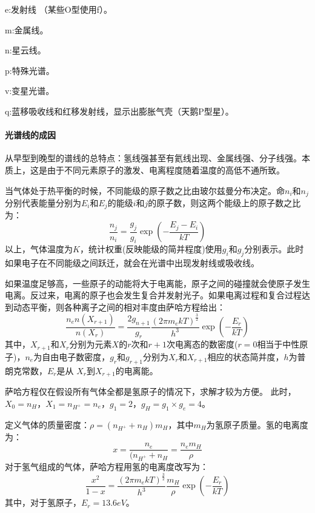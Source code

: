 e:发射线 （某些O型使用f）。

m:金属线。

n:星云线。

p:特殊光谱。

v:变星光谱。

q:蓝移吸收线和红移发射线，显示出膨胀气壳（天鹅P型星）。

\paragraph{光谱线的成因}从早型到晚型的谱线的总特点：氢线强甚至有氦线出现、金属线强、分子线强。本质上，这是由于不同元素原子的激发、电离程度随着温度的高低不通所致。

当气体处于热平衡的时候，不同能级的原子数之比由玻尔兹曼分布决定。命$n_{i}$和$n_{j}$分别代表能量分别为$E_{i}$和$E_{j}$的能级$i$和$j$的原子数，则这两个能级上的原子数之比为：
\begin{equation}
	\frac{n_{j}}{n_{i}}=\frac{g_{j}}{g_{i}}\exp\left(-\frac{E_{j}-E_{i}}{kT}\right)
\end{equation}
以上，气体温度为$K$，统计权重(反映能级的简并程度)使用$g_{i}$和$g_{j}$分别表示。此时如果电子在不同能级之间跃迁，就会在光谱中出现发射线或吸收线。

如果温度足够高，一些原子的动能将大于电离能，原子之间的碰撞就会使原子发生电离。反过来，电离的原子也会发生复合并发射光子。如果电离过程和复合过程达到动态平衡，则各种离子之间的相对丰度由萨哈方程给出：
\begin{equation}
	\frac{n_{e}n(X_{r+1})}{n(X_{r})}=\frac{2g_{n+1}}{g_{r}}\frac{\left(2\pi m_{e}kT\right)^{\frac{3}{2}}}{h^3}\exp \left(-\frac{E_{r}}{kT}\right)
\end{equation}
其中，$X_{r+1}$和$X_{r}$分别为元素$X$的$r$次和$r+1$次电离态的数密度($r=0$相当于中性原子)，$n_{e}$为自由电子数密度，$g_{r}$和$g_{r+1}$分别为$X_{r}$和$X_{r+1}$相应的状态简并度，$h$为普朗克常数，$E_{r}$是从
$X_{r}$到$X_{r+1}$的电离能。

萨哈方程仅在假设所有气体全都是氢原子的情况下，求解才较为方便。
此时，$X_{0}=n_{H}$，$X_{1}=n_{H^+}=n_{e}$，$g_{1}=2$，$g_{H}=g_{1}\times g_{e}=4$。

定义气体的质量密度：$\rho=\left(n_{H^+}+n_{H}\right)m_{H}$，其中$m_{H}$为氢原子质量。氢的电离度为：
\begin{equation}
	x=\frac{n_{e}}{(n_{H^+}+n_{H}}=\frac{n_{e}m_{H}}{\rho}
\end{equation}
对于氢气组成的气体，萨哈方程用氢的电离度改写为：
\begin{equation}
	\frac{x^2}{1-x}=\frac{\left(2\pi m_{e}kT\right)^{\frac{3}{2}}}{h^3}\frac{m_{H}}{\rho}\exp \left(-\frac{E_{r}}{kT}\right)
\end{equation}
其中，对于氢原子，$E_{r}=13.6eV$。

